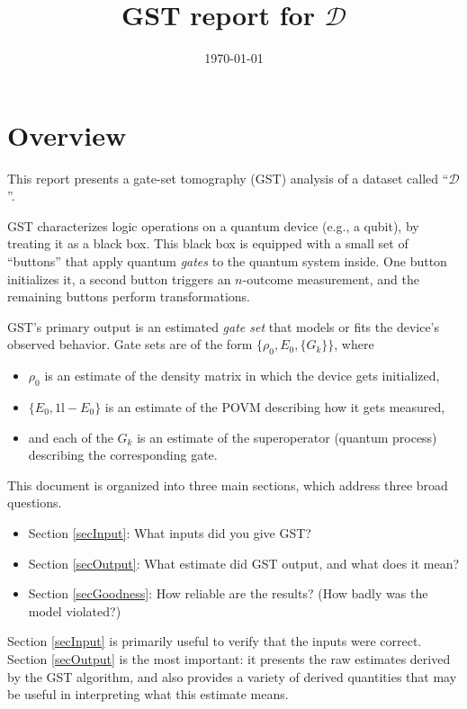 \documentclass{article}[11pt]
\def\Id{1\!\mathrm{l}}
\begin{document}
\title{GST report for $\mathcal{D}$}
\date{\vspace{-1cm}\today}

\begingroup
\let\center\flushleft
\let\endcenter\endflushleft
\maketitle
\endgroup

\tableofcontents

\section{Overview}
This report presents a gate-set tomography (GST) analysis of a dataset called ``$\mathcal{D}$''.  

GST characterizes logic operations on a quantum device (e.g., a qubit), by treating it as a black box.  This black box is equipped with a small set of ``buttons'' that apply quantum \emph{gates} to the quantum system inside.  One button initializes it, a second button triggers an $n$-outcome measurement, and the remaining buttons perform transformations.  %

GST's primary output is an estimated \emph{gate set} that models or fits the device's observed behavior.  Gate sets are of the form $\{\rho_0,E_0,\{G_k\}\}$, where
\begin{itemize}
\item $\rho_0$ is an estimate of the density matrix in which the device gets initialized,
\item $\{E_0,\Id-E_0\}$ is an estimate of the POVM describing how it gets measured,
\item and each of the $G_k$ is an estimate of the superoperator (quantum process) describing the corresponding gate.
\end{itemize}

This document is organized into three main sections, which address three broad questions.
\begin{itemize}
\item Section \ref{secInput}:  What inputs did you give GST?
\item Section \ref{secOutput}:  What estimate did GST output, and what does it mean?
\item Section \ref{secGoodness}:  How reliable are the results? (How badly was the model violated?)
\end{itemize}
Section \ref{secInput} is primarily useful to verify that the inputs were correct.  Section \ref{secOutput} is the most important:  it presents the raw estimates derived by the GST algorithm, and also provides a variety of derived quantities that may be useful in interpreting what this estimate means.
\end{document}
